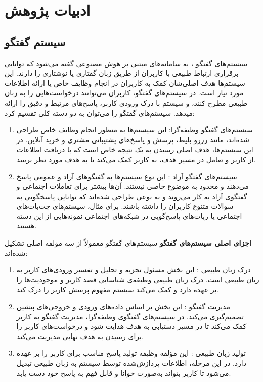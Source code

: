 \section{ادبیات پژوهش}
\label{ResearchLiterature:my}

\subsection{سیستم گفتگو}

سیستم‌های گفتگو%
،
 به سامانه‌های مبتنی بر هوش مصنوعی گفته می‌شود که توانایی برقراری ارتباط طبیعی با کاربران از طریق زبان گفتاری یا نوشتاری را دارند. این سیستم‌ها هدف اصلی‌شان کمک به کاربران در انجام وظایف خاص یا ارائه اطلاعات مورد نیاز است. در سیستم‌های گفتگو، کاربران می‌توانند درخواست‌هایی را به زبان طبیعی مطرح کنند، و سیستم با درک ورودی کاربر، پاسخ‌های مرتبط و دقیق را ارائه میدهد.
\newline
سیستم‌های گفتگو را می‌توان به دو دسته کلی تقسیم کرد:
\begin{enumerate}
\item
سیستم‌های گفتگو وظیفه‌گرا: این سیستم‌ها به منظور انجام وظایف خاص طراحی شده‌اند، مانند رزرو بلیط، پرسش و پاسخ‌های پشتیبانی مشتری و خرید آنلاین. در این سیستم‌ها، هدف اصلی رسیدن به یک نتیجه خاص است که با دریافت اطلاعات از کاربر و تعامل در مسیر هدف، به کاربر کمک می‌کند تا به هدف مورد نظر برسد.
\item
سیستم‌های گفتگو آزاد%
: این نوع سیستم‌ها به گفتگوهای آزاد و عمومی پاسخ می‌دهند و محدود به موضوع خاصی نیستند. آن‌ها بیشتر برای تعاملات اجتماعی و گفتگوی آزاد به کار می‌روند و به نوعی طراحی شده‌اند که توانایی پاسخگویی به سوالات متنوع کاربران را داشته باشند. برای مثال، سیستم‌های چت‌بات‌های اجتماعی یا ربات‌های پاسخ‌گویی در شبکه‌های اجتماعی نمونه‌هایی از این دسته هستند.
\end{enumerate}

\textbf{اجزای اصلی سیستم‌های گفتگو}\newline
سیستم‌های گفتگو معمولاً از سه مؤلفه اصلی تشکیل شده‌اند:
\begin{enumerate}
\item
درک زبان طبیعی%
: این بخش مسئول تجزیه و تحلیل و تفسیر ورودی‌های کاربر به زبان طبیعی است. درک زبان طبیعی وظیفه‌ی شناسایی قصد کاربر و موجودیت‌ها را بر عهده دارد و کمک می‌کند سیستم مفهوم پرسش کاربر را درک کند.
\item
مدیریت گفتگو%
: این بخش بر اساس داده‌های ورودی و خروجی‌های پیشین تصمیم‌گیری می‌کند. در سیستم‌های گفتگوی وظیفه‌گرا، مدیریت گفتگو به کاربر کمک می‌کند تا در مسیر دستیابی به هدف هدایت شود و درخواست‌های کاربر را برای رسیدن به هدف نهایی مدیریت می‌کند.
\item
تولید زبان طبیعی%
: این مؤلفه وظیفه تولید پاسخ مناسب برای کاربر را بر عهده دارد. در این مرحله، اطلاعات پردازش‌شده توسط سیستم به زبان طبیعی تبدیل می‌شود تا کاربر بتواند به‌صورت خوانا و قابل فهم به پاسخ خود دست یابد.
\end{enumerate}

